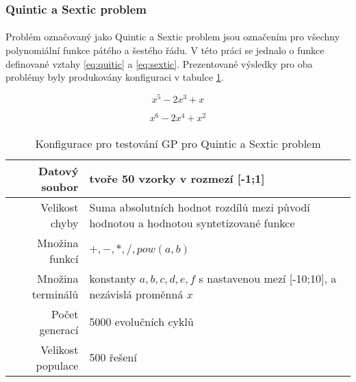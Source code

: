 \documentclass[bc,male,java,dept460]{diploma}		%
\begin{document}
\subsubsection{Quintic a Sextic problem}
\paragraph*{}
Problém označovaný jako Quintic a Sextic problem jsou označením pro všechny polynomiální funkce pátého a šestého řádu. V této práci se jednalo o funkce definované vztahy \ref{eq:quitic} a \ref{eq:sextic}. Prezentované výsledky pro oba problémy byly produkovány konfiguraci v tabulce \ref{tab:quintic_conf}.

\begin{equation} \label{eq:quitic}
x^5-2x^3+x
\end{equation}


\begin{equation} \label{eq:sextic}
x^6-2x^4+x^2
\end{equation}


\paragraph*{}
\begin{table}
  \centering
  \begin{tabular}{| r | p{9cm} |} \hline
    Datový soubor & tvoře 50 vzorky v rozmezí [-1;1] \\ \hline
    Velikost chyby & Suma absolutních hodnot rozdílů mezi původí hodnotou a hodnotou syntetizované funkce \\ \hline
    Množina funkcí & $+, -, *, /, pow(a,b)$ \\ \hline
    Množina terminálů & konstanty $a, b, c, d, e, f$ s nastavenou mezí [-10;10], a nezávislá proměnná $x$ \\ \hline
    Počet generací & 5000 evolučních cyklů \\ \hline
    Velikost populace & 500 řešení \\ \hline
  \end{tabular}
  \label{tab:quintic_conf}
  \caption{Konfigurace pro testování GP pro Quintic a Sextic problem}
\end{table}
\end{document}
